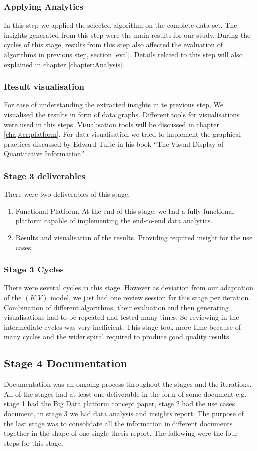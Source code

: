 \subsubsection{Applying Analytics}
In this step we applied the selected algorithm on the complete data set. The insights generated from this step were the main results for our study. During the cycles of this stage, results from this step also affected the evaluation of algorithms in previous step, section \ref{eval}. Details related to this step will also explained in chapter \ref{chapter:Analysis}.    
\subsubsection{Result visualisation}
For ease of understanding the extracted insights in te previous step, We visualised the results in form of data graphs. Different tools for visualisations were used in this steps. Visualisation tools will be discussed in chapter \ref{chapter:platform}. For data visualisation we tried to implement the graphical practices discussed by Edward Tufte in his book ``The Visual Display of Quantitative Information'' \cite{tufte1983visual}.
\subsubsection{Stage 3 deliverables}
There were two deliverables of this stage.
\begin{enumerate}
\item Functional Platform. At the end of this stage, we had a fully functional platform capable of implementing the end-to-end data analytics.
\item Results and visualisation of the results. Providing required insight for the use cases. 
\end{enumerate}
\subsubsection{Stage 3 Cycles}
There were several cycles in this stage. However as deviation from our adaptation of the \((K|V)\) model, we just had one review session for this stage per iteration. Combination of different algorithms, their evaluation and then generating visualisations had to be repeated and tested many times. So reviewing in the intermediate cycles was very inefficient. This stage took more time because of many cycles and the wider spiral required to produce good quality results.
\subsection{Stage 4 Documentation}
Documentation was an ongoing process throughout the stages and the iterations. All of the stages had at least one deliverable in the form of some document e.g. stage 1 had the Big Data platform concept paper, stage 2 had the use cases document, in stage 3 we had data analysis and insights report. The purpose of the last stage was to consolidate all the information in different documents together in the shape of one single thesis report. The following were the four steps for this stage. 
